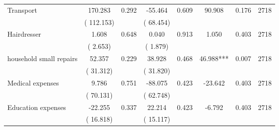 \begin{tabular}{l*{7}{c}}
 Transport       &            170.283       &        0.292  &            -55.464       &        0.609  &             90.908       &              0.176 &  2718 \\ 
                       &       (     112.153)             &                               &       (      68.454)                     &                               &                                               &                                &                      \\ 

 Hairdresser       &              1.608       &        0.648  &              0.040       &        0.913  &              1.050       &              0.403 &  2718 \\ 
                       &       (       2.653)             &                               &       (       1.879)                     &                               &                                               &                                &                      \\ 

 household small repairs       &             52.357       &        0.229  &             38.928       &        0.468  &             46.988***       &              0.007 &  2718 \\ 
                       &       (      31.312)             &                               &       (      31.820)                     &                               &                                               &                                &                      \\ 

 Medical expenses       &              9.786       &        0.751  &            -88.075       &        0.423  &            -23.642       &              0.403 &  2718 \\ 
                       &       (      70.131)             &                               &       (      62.748)                     &                               &                                               &                                &                      \\ 

 Education expenses       &            -22.255       &        0.337  &             22.214       &        0.423  &             -6.792       &              0.403 &  2718 \\ 
                       &       (      16.818)             &                               &       (      15.117)                     &                               &                                               &                                &                      \\ 


\end{tabular}
